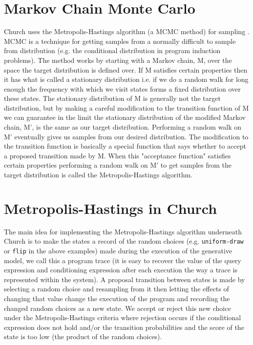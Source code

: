\documentclass[a4paper,10pt]{article}
\begin{document}
\section{Markov Chain Monte Carlo}
Church uses the Metropolis-Hastings algorithm (a MCMC method) for sampling \cite{N.D.Goodman:2008:f2a0d}.  MCMC is a technique for getting samples from a normally difficult to sample from distribution (e.g. the conditional distribution in program induction problems).  The method works by starting with a Markov chain, M, over the space the target distribution is defined over.  If M satisfies certain properties then it has what is called a stationary distribution i.e. if we do a random walk for long enough the frequency with which we visit states forms a fixed distribution over these states.  The stationary distribution of M is generally not the target distribution, but by making a careful modification to the transition function of M we can guarantee in the limit the stationary distribution of the modified Markov chain, M', is the same as our target distribution.  Performing a random walk on M' eventually gives us samples from our desired distribution.  The modification to the transition function is basically a special function that says whether to accept a proposed transition made by M.  When this "acceptance function" satisfies certain properties performing a random walk on M' to get samples from the target distribution is called the Metropolis-Hastings algorithm.

\section{Metropolis-Hastings in Church}
The main idea for implementing the Metropolis-Hastings algorithm underneath Church is to make the states a record of the random choices (e.g. \texttt{uniform-draw} or \texttt{flip} in the above examples) made during the execution of the generative model, we call this a program trace (it is easy to recover the value of the query expression and conditioning expression after each execution the way a trace is represented within the system).  A proposal transition between states is made by selecting a random choice and resampling from it then letting the effects of changing that value change the execution of the program and recording the changed random choices as a new state.  We accept or reject this new choice under the Metropolis-Hastings criteria where rejection occurs if the conditional expression does not hold and/or the transition probabilities and the score of the state is too low (the product of the random choices). 
\end{document}
